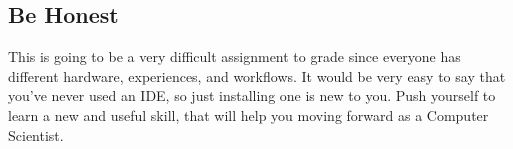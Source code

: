 \documentclass{article}
\begin{document}
\subsection*{Be Honest}
This is going to be a very difficult assignment to grade since everyone has
different hardware, experiences, and workflows. It would be very easy to say
that you've never used an IDE, so just installing one is new to you. Push
yourself to learn a new and useful skill, that will help you moving forward as
a Computer Scientist.
\end{document}
